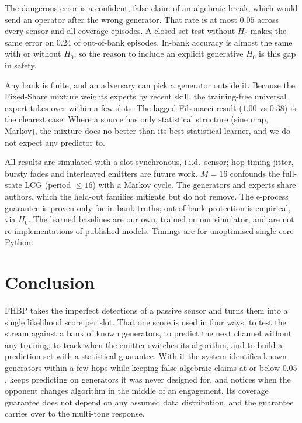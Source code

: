 \documentclass[conference]{IEEEtran}
\begin{document}
The dangerous error is a confident, false claim of an algebraic break, which
would send an operator after the wrong generator. That rate is at most $0.05$
across every sensor and all coverage episodes. A closed-set test without $H_0$
makes the same error on $0.24$ of out-of-bank episodes. In-bank accuracy is
almost the same with or without $H_0$, so the reason to include an explicit
generative $H_0$ is this gap in safety.

Any bank is finite, and an adversary can pick a generator outside it. Because
the Fixed-Share mixture weights experts by recent skill, the training-free
universal expert takes over within a few slots. The lagged-Fibonacci result
($1.00$ vs $0.38$) is the clearest case. Where a source has only statistical
structure (sine map, Markov), the mixture does no better than its best
statistical learner, and we do not expect any predictor to.

All results are simulated with a slot-synchronous, i.i.d.\ sensor; hop-timing
jitter, bursty fades and interleaved emitters are future work. $M=16$ confounds
the full-state LCG (period $\leq 16$) with a Markov cycle. The generators and
experts share authors, which the held-out families mitigate but do not remove.
The e-process guarantee is proven only for in-bank truths; out-of-bank
protection is empirical, via $H_0$. The learned baselines are our own, trained
on our simulator, and are not re-implementations of published models. Timings
are for unoptimised single-core Python.

\section{Conclusion}
FHBP takes the imperfect detections of a passive sensor and turns them into a
single likelihood score per slot. That one score is used in four ways: to test
the stream against a bank of known generators, to predict the next channel
without any training, to track when the emitter switches its algorithm, and to
build a prediction set with a statistical guarantee. With it the system
identifies known generators within a few hops while keeping false algebraic
claims at or below $0.05$, keeps predicting on generators it was never designed
for, and notices when the opponent changes algorithm in the middle of an
engagement. Its coverage guarantee does not depend on any assumed data
distribution, and the guarantee carries over to the multi-tone response.
\end{document}
